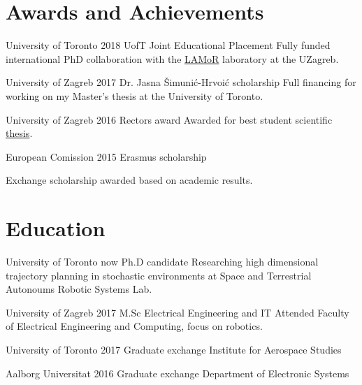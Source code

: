 \documentclass{tccv}
\begin{document}
\section{Awards and Achievements}
\begin{yearlist}
\item[University of Toronto]{2018}
     {UofT Joint Educational Placement}
     {{\small Fully funded international PhD collaboration with the \href{https://lamor.fer.hr/}{LAMoR} laboratory at the UZagreb.}}
     
\item[University of Zagreb]{2017}
     {Dr. Jasna Šimunić-Hrvoić scholarship}
     {{\small Full financing for working on my Master's thesis at the University of Toronto.}}

\item[University of Zagreb]{2016}
     {Rectors award}
     {{\small Awarded for best student scientific \href{https://www.dropbox.com/s/k66438qy0xz13c4/rektorova.pdf?dl=0}{thesis}.}}

     
\item[European Comission]{2015}
     {Erasmus scholarship}
     {\begin{small}
     Exchange scholarship awarded based on academic results.
     \end{small}}
\end{yearlist}


\section{Education}
\begin{yearlist}
\item[University of Toronto]{now}
     {Ph.D candidate}
     {{\small Researching high dimensional trajectory planning in stochastic environments at Space and Terrestrial Autonoums Robotic Systems Lab.}}
\item[University of Zagreb]{2017}
     {M.Sc Electrical Engineering and IT}
     {{\small Attended Faculty of Electrical Engineering and Computing, focus on robotics.}}
\item[University of Toronto]{2017}
     {Graduate exchange}
     {{\small Institute for Aerospace Studies}}
\item[Aalborg Universitat]{2016}
     {Graduate exchange}
     {{\small Department of Electronic Systems}}

\end{yearlist}
\end{document}
